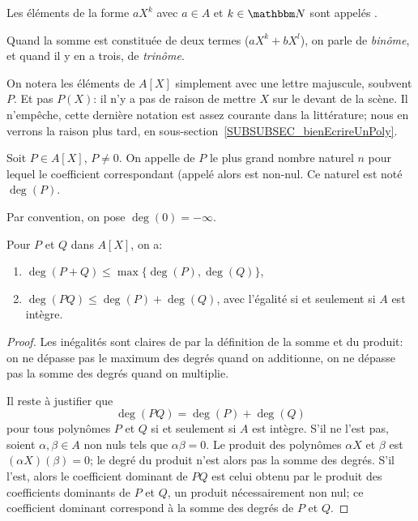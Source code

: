 \begin{definition}
Les éléments de la forme \( a X^k\) avec \( a \in A\) et \( k\in\eN\) sont appelés .

Quand la somme est constituée de deux termes (\( a X^k + b X^l\)), on parle de \emph{binôme}, et quand il y en a trois, de \emph{trinôme}.
\end{definition}

  On notera les éléments de \( A[X] \) simplement avec une lettre majuscule, soubvent \( P \). Et pas \(P(X) \): il n'y a pas de raison de mettre \( X \) sur le devant de la scène. Il n'empêche, cette dernière notation est assez courante dans la littérature; nous en verrons la raison plus tard, en sous-section~\ref{SUBSUBSEC_bienEcrireUnPoly}.

\begin{definition}  \label{DefDegrePoly}
    Soit \( P \in A[X] \), \( P \neq 0 \). On appelle  de $P$ le plus grand nombre naturel $n$ pour lequel le coefficient correspondant (appelé alors  est non-nul. Ce naturel est noté \( \deg(P) \).
    
    Par convention, on pose \( \deg(0)=-\infty\).
\end{definition}

\begin{lemma}    \label{LEM_degresEtOpPolynomes}
  Pour \( P \) et \( Q \) dans \( A[X]\), on a:
  \begin{enumerate}
  \item
    \( \deg(P+Q) \leq \max\{\deg(P), \deg(Q)\}\),
  \item
    \( \deg(PQ)\leq\deg(P)+\deg(Q)\), avec l'égalité si et seulement si \( A \) est intègre.  
  \end{enumerate}
\end{lemma}

\begin{proof}
  Les inégalités sont claires de par la définition de la somme et du produit: on ne dépasse pas le maximum des degrés quand on additionne, on ne dépasse pas la somme des degrés quand on multiplie.
  
  Il reste à justifier que
  \begin{equation}
      \deg(PQ)=\deg(P)+\deg(Q)
  \end{equation}
  pour tous polynômes \( P \) et \( Q \) si et seulement si \( A \) est intègre. S'il ne l'est pas, soient \( \alpha,\beta\in A\) non nuls tels que \( \alpha\beta=0\). Le produit des polynômes \(\alpha X\) et \(\beta\) est \( (\alpha X)(\beta)=0\); le degré du produit n'est alors pas la somme des degrés. S'il l'est, alors le coefficient dominant de \( PQ \) est celui obtenu par le produit des coefficients dominants de \( P \) et \( Q \), un produit nécessairement non nul; ce coefficient dominant correspond à la somme des degrés de \( P \) et \( Q \).
\end{proof}

